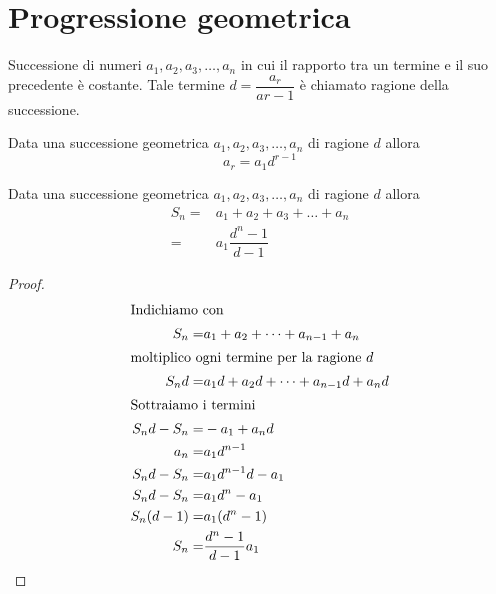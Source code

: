 \section{Progressione geometrica}\label{sec:progressione-geometrica}
\begin{defn}\label{defn:ProgGeom1}
		Successione di numeri $a_1,a_2,a_3,\dots,a_n$ in cui il rapporto tra un termine e il suo precedente è costante. Tale termine $d=\dfrac{a_r}{a{r-1}}$ è chiamato ragione della successione.
\end{defn}
\begin{prop}
	Data una successione geometrica $a_1,a_2,a_3,\dots,a_n$ di ragione $d$ allora\[a_r=a_1d^{r-1}\]
\end{prop}
\begin{thm}\label{thm:SommaProgGeo}
		Data una successione geometrica $a_1,a_2,a_3,\dots,a_n$ di ragione $d$ allora 
		\begin{align*}
			S_n=&a_1+a_2+a_3+\dots+a_n\\
			=&a_1\dfrac{d^n-1}{d-1}
		\end{align*}
\end{thm}
\begin{proof}
\begin{align*}
\intertext{Indichiamo con}
S_n=&a_1+a_2+\dots+a_{n-1}+a_n\\
\intertext{moltiplico ogni termine per la ragione $d$}
S_nd=&a_1d+a_2d+\dots+a_{n-1}d+a_nd\\
\intertext{Sottraiamo i termini}
S_nd-S_n=&-a_1+a_nd\\
a_n=&a_1d^{n-1}\\
S_nd-S_n=&a_1d^{n-1}d-a_1\\
S_nd-S_n=&a_1d^{n}-a_1\\
S_n(d-1)=&a_1(d^{n}-1)\\
S_n=&\dfrac{d^{n}-1}{d-1}a_1\\
\end{align*}
\end{proof}